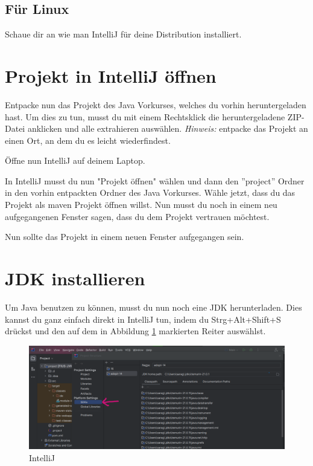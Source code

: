 \subsection*{Für Linux}
Schaue dir an wie man IntelliJ für deine Distribution installiert.\newline

\section*{Projekt in IntelliJ öffnen}
Entpacke nun das Projekt des Java Vorkurses, welches du vorhin heruntergeladen hast. 
Um dies zu tun, musst du mit einem Rechtsklick die heruntergeladene ZIP-Datei anklicken und alle extrahieren auswählen. 
\textit{Hinweis:} entpacke das Projekt an einen Ort, an dem du es leicht wiederfindest.\newline

Öffne nun IntelliJ auf deinem Laptop.\newline

In IntelliJ musst du nun "Projekt öffnen" wählen und dann den ''project'' Ordner in den vorhin entpackten Ordner des Java Vorkurses. 
Wähle jetzt, dass du das Projekt als maven Projekt öffnen willst. 
Nun musst du noch in einem neu aufgegangenen Fenster sagen, dass du dem Projekt vertrauen möchtest.\newline

Nun sollte das Projekt in einem neuen Fenster aufgegangen sein.\newline

\section*{JDK installieren}
Um Java benutzen zu können, musst du nun noch eine JDK herunterladen. 
Dies kannst du ganz einfach direkt in IntelliJ tun, indem du Strg+Alt+Shift+S drückst und den auf dem in Abbildung \ref{fig:IntelliJJDK} markierten Reiter auswählst.
\begin{figure}[h]
\begin{center}
\includegraphics[width=\linewidth]{./figures/IntelliJ JDK.PNG}
\end{center}
\caption{IntelliJ}
\label{fig:IntelliJJDK}
\end{figure}


